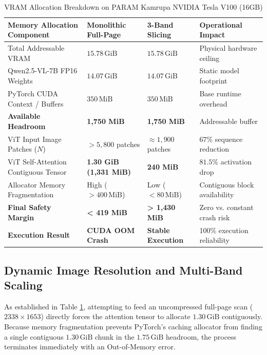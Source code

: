 \begin{table}[htbp]
\centering
\caption{VRAM Allocation Breakdown on PARAM Kamrupa NVIDIA Tesla V100 (16GB)}
\label{tab:vram_arithmetic}
\vspace{0.2cm}
\small
\begin{tabular}{p{4.6cm}p{2.6cm}p{2.4cm}p{3.6cm}}
\toprule
\textbf{Memory Allocation Component} & \textbf{Monolithic Full-Page} & \textbf{3-Band Slicing} & \textbf{Operational Impact} \\
\midrule
Total Addressable VRAM & $15.78\,\text{GiB}$ & $15.78\,\text{GiB}$ & Physical hardware ceiling \\
Qwen2.5-VL-7B FP16 Weights & $14.07\,\text{GiB}$ & $14.07\,\text{GiB}$ & Static model footprint \\
PyTorch CUDA Context / Buffers & $350\,\text{MiB}$ & $350\,\text{MiB}$ & Base runtime overhead \\
\midrule
\textbf{Available Headroom} & \textbf{1,750 MiB} & \textbf{1,750 MiB} & Addressable buffer \\
\midrule
ViT Input Image Patches ($N$) & $> 5,800$ patches & $\approx 1,900$ patches & $67\%$ sequence reduction \\
ViT Self-Attention Contiguous Tensor & \textbf{1.30 GiB (1,331 MiB)} & \textbf{240 MiB} & $81.5\%$ activation drop \\
Allocator Memory Fragmentation & High ($> 400\,\text{MiB}$) & Low ($< 80\,\text{MiB}$) & Contiguous block availability \\
\midrule
\textbf{Final Safety Margin} & \textbf{< 419 MiB} & \textbf{> 1,430 MiB} & Zero vs. constant crash risk \\
\textbf{Execution Result} & \textbf{CUDA OOM Crash} & \textbf{Stable Execution} & 100\% execution reliability \\
\bottomrule
\end{tabular}
\end{table}

\subsection{Dynamic Image Resolution and Multi-Band Scaling}
As established in Table \ref{tab:vram_arithmetic}, attempting to feed an uncompressed full-page scan ($2338 \times 1653$) directly forces the attention tensor to allocate $1.30\,\text{GiB}$ contiguously. Because memory fragmentation prevents PyTorch's caching allocator from finding a single contiguous $1.30\,\text{GiB}$ chunk in the $1.75\,\text{GiB}$ headroom, the process terminates immediately with an Out-of-Memory error.

